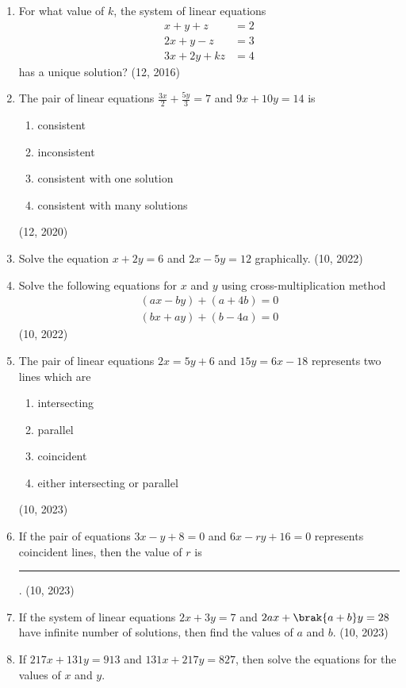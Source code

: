 \begin{enumerate}[label=\thesubsection.\arabic*,ref=\thesubsection.\theenumi]
\item For what value of $k$, the system of linear equations
      \begin{align*}
          x+y+z    & = 2 \\
          2x+y-z   & =3  \\
          3x+2y+kz & =4
      \end{align*}
      has a unique solution? \hfill (12, 2016)
\item The pair of linear equations
$\frac{3x}{2}+\frac{5y}{3}=7$ and $9x+10y=14$ is
\begin{enumerate}[label=(\alph*)]
\item consistent
\item inconsistent
\item consistent with one solution 
\item consistent with many solutions 
\end{enumerate}
\hfill (12, 2020)
\item Solve the equation $x+2y=6$ and $2x-5y=12$ graphically.
\hfill (10, 2022)
\item Solve the following equations for $x$ and $y$ using cross-multiplication method
	\begin{align*}
		(ax-by)+(a+4b)=0 \\
                (bx+ay)+(b-4a)=0
	\end{align*}
\hfill (10, 2022)
	\item The pair of linear equations $ 2x=5y+6 $ and $ 15y=6x-18 $ represents two lines which are  
\begin{enumerate}
    \item intersecting
    \item parallel
    \item coincident
    \item either intersecting or parallel
\end{enumerate}
\hfill (10, 2023)
\item If the pair of equations $3x - y + 8 = 0$ and $6x - ry +16 =0$ represents coincident lines, then the value of $r$ is \rule{1cm}{0.2pt}.
\hfill (10, 2023)
\item If the system of linear equations 
$2x + 3y = 7$  and   $2ax +\brak{a + b}y =28$ 
have infinite number of solutions, then find the values of $a$ and $b$.
\hfill (10, 2023)
\item  If $217x + 131y = 913$ and  
$131x + 217y = 827$,  then solve the equations for the values of $x$ and $y$.

\end{enumerate}
